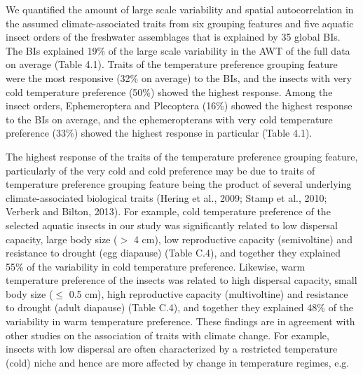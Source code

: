 \begin{landscape}
We quantified the amount of large scale variability and spatial autocorrelation in the assumed climate-associated traits from six grouping features and five aquatic insect orders of the freshwater assemblages that is explained by 35 global BIs. The BIs explained 19\% of the large scale variability in the AWT of the full data on average (Table 4.1). Traits of the temperature preference grouping feature were the most responsive (32\% on average)  to the BIs, and the insects with very cold temperature preference (50\%) showed the highest response. Among the insect orders, Ephemeroptera and Plecoptera (16\%) showed the highest response to the BIs on average, and the ephemeropterans with very cold temperature preference (33\%) showed the highest response in particular (Table 4.1).

The highest response of the traits of the temperature preference grouping feature, particularly of the very cold and cold preference may be due to traits of temperature preference grouping feature being the product of several underlying climate-associated biological traits (Hering et al., 2009; Stamp et al., 2010; Verberk and Bilton, 2013). For example, cold temperature preference of the selected aquatic insects in our study was significantly related to low dispersal capacity, large body size ($>$ 4 cm), low reproductive capacity (semivoltine) and resistance to drought (egg diapause) (Table C.4), and together they explained 55\% of the variability in cold temperature preference. Likewise, warm temperature preference of the insects was related to high dispersal capacity, small body size ($\leq$ 0.5 cm), high reproductive capacity (multivoltine) and resistance to drought (adult diapause) (Table C.4), and together they explained 48\% of the variability in warm temperature preference. These findings are in agreement with other studies on the association of traits with climate change. For example, insects with low dispersal are often characterized by a restricted temperature (cold) niche and hence are more affected by change in temperature regimes, e.g.

\end{landscape}

